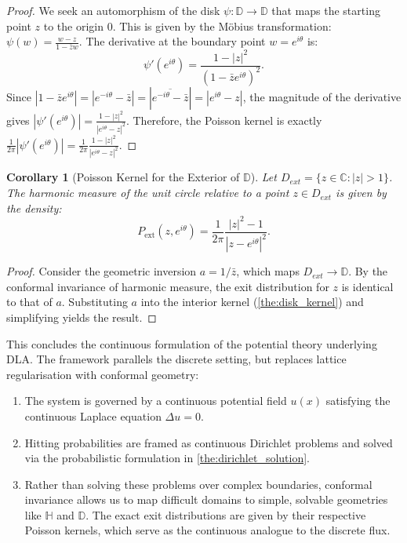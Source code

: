 \documentclass[12pt, a4paper, oneside]{report}
\newtheorem{corollary}[theorem]{Corollary}
\theoremstyle{remark}
\begin{document}
\begin{proof}
We seek an automorphism of the disk $\psi: \mathbb{D} \to \mathbb{D}$ that maps the starting point $z$ to the origin $0$. This is given by the M\"obius transformation: $\psi(w) = \frac{w - z}{1 - \bar{z}w}$. The derivative at the boundary point $w = e^{i\theta}$ is:
\begin{equation*}
    \psi'(e^{i\theta}) =  \frac{1 - |z|^2}{(1 - \bar{z}e^{i\theta})^2}.
\end{equation*}
Since $|1 - \bar{z}e^{i\theta}| = |e^{-i\theta} - \bar{z}| = |\overline{e^{-i\theta} - \bar{z}}| = |e^{i\theta} - z|$, the magnitude of the derivative gives $|\psi'(e^{i\theta})| = \frac{1 - |z|^2}{|e^{i\theta} - z|^2}$. Therefore, the Poisson kernel is exactly $\frac{1}{2\pi} |\psi'(e^{i\theta})| = \frac{1}{2\pi} \frac{1-|z|^2}{|e^{i\theta} - z|^2}$.
\end{proof}

\begin{corollary}[Poisson Kernel for the Exterior of $\mathbb{D}$]
\label{cor:exterior_kernel}
Let $D_{ext} = \{z \in \mathbb{C} : |z| > 1\}$. The harmonic measure of the unit circle relative to a point $z \in D_{ext}$ is given by the density:
\begin{equation*}
P_{\text{ext}}(z, e^{i\theta}) = \frac{1}{2\pi} \frac{|z|^2 - 1}{|z - e^{i\theta}|^2}.
\end{equation*}
\end{corollary}
\begin{proof}
Consider the geometric inversion $a = 1/\bar{z}$, which maps $D_{ext} \to \mathbb{D}$. By the conformal invariance of harmonic measure, the exit distribution for $z$ is identical to that of $a$. Substituting $a$ into the interior kernel (\cref{the:disk_kernel}) and simplifying yields the result.
\end{proof}

This concludes the continuous formulation of the potential theory underlying DLA. The framework parallels the discrete setting, but replaces lattice regularisation with conformal geometry:
\begin{enumerate}
    \item The system is governed by a continuous potential field $u(x)$ satisfying the continuous Laplace equation $\Delta u = 0$.
    \item Hitting probabilities are framed as continuous Dirichlet problems and solved via the probabilistic formulation in \cref{the:dirichlet_solution}.
    \item Rather than solving these problems over complex boundaries, conformal invariance allows us to map difficult domains to simple, solvable geometries like $\mathbb{H}$ and $\mathbb{D}$. The exact exit distributions are given by their respective Poisson kernels, which serve as the continuous analogue to the discrete flux.
\end{enumerate}
\end{document}
